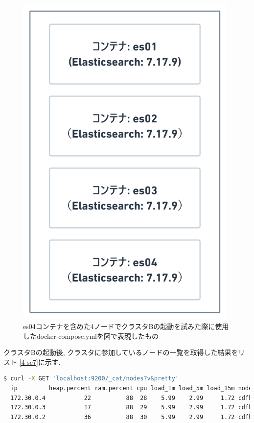 \begin{figure}[H]
  \begin{center}
    \includegraphics[width=110mm]{sotu/figure/4-7.17.9.png}
    \caption{es04コンテナを含めた4ノードでクラスタBの起動を試みた際に使用したdocker-compose.ymlを図で表現したもの}
    \label{4-p13}
  \end{center}
\end{figure}

クラスタBの起動後, クラスタに参加しているノードの一覧を取得した結果をリスト \ref{4-sc7}に示す.

\begin{lstlisting}[language=bash, caption=クラスタBに参加しているノード一覧, label=4-sc7]
  $ curl -X GET 'localhost:9200/_cat/nodes?v&pretty'
  ip         heap.percent ram.percent cpu load_1m load_5m load_15m node.role   master name
  172.30.0.4           22          88  28    5.99    2.99     1.72 cdfhilmrstw -      es03
  172.30.0.3           17          88  29    5.99    2.99     1.72 cdfhilmrstw *      es02
  172.30.0.2           36          88  30    5.99    2.99     1.72 cdfhilmrstw -      es01
\end{lstlisting}

